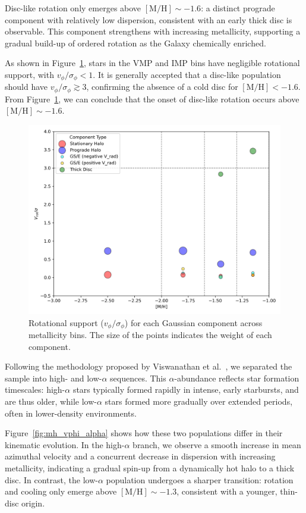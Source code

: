 \documentclass[a4paper,10pt]{article}
\begin{document}
\begin{multicols}{2}
Disc-like rotation only emerges above $\mathrm{[M/H]} \sim -1.6$: a distinct prograde component with 
relatively low dispersion, consistent with an early thick disc is observable. 
This component strengthens with increasing metallicity, supporting a gradual build-up of 
ordered rotation as the Galaxy chemically enriched.

As shown in Figure~\ref{fig:v_over_sigma}, stars in the VMP and IMP bins have negligible rotational support, 
with $v_\phi / \sigma_\phi < 1$. It is generally accepted that a disc-like population should have 
$v_\phi / \sigma_\phi \gtrsim 3$, confirming the absence of a cold disc for $\mathrm{[M/H]} < -1.6$.
From Figure~\ref{fig:v_over_sigma}, we can conclude that the onset of disc-like rotation occurs 
above $\mathrm{[M/H]} \sim -1.6$.

\begin{figure}[H]
  \centering
  \includegraphics[width=0.7\linewidth]{../figures/v_over_sigma_per_component.png}
  \caption{Rotational support ($v_\phi / \sigma_\phi$) for each Gaussian component across metallicity bins.
  The size of the points indicates the weight of each component.}
  \label{fig:v_over_sigma}
\end{figure}


Following the methodology proposed by Viswanathan et al.~\cite{Vis2024}, we separated the sample into 
high- and low-$\alpha$ sequences. This $\alpha$-abundance reflects star formation timescales: high-$\alpha$ 
stars typically formed rapidly in intense, early starbursts, and are thus older, while low-$\alpha$ stars 
formed more gradually over extended periods, often in lower-density environments.

Figure~\ref{fig:mh_vphi_alpha} shows how these two populations differ in their kinematic evolution. 
In the high-$\alpha$ branch, we observe a smooth increase in mean azimuthal velocity and a concurrent 
decrease in dispersion with increasing metallicity, indicating a gradual spin-up from a dynamically hot 
halo to a thick disc. In contrast, the low-$\alpha$ population undergoes a sharper transition: 
rotation and cooling only emerge above $\mathrm{[M/H]} \sim -1.3$, consistent with a younger, thin-disc origin.


\end{multicols}
\end{document}

